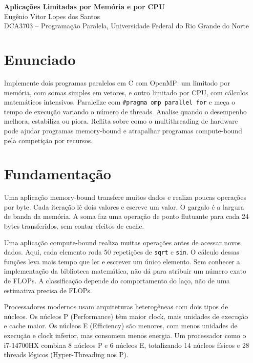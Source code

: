 \documentclass[11pt,letterpaper]{article}
\begin{document}
\pagestyle{plain}
\begin{center}
{\LARGE\bfseries Aplicações Limitadas por Memória e por CPU}\\[0.4em]
{\normalsize Eugênio Vitor Lopes dos Santos}\\[0.3em]
{\small DCA3703 -- Programação Paralela, Universidade Federal do Rio Grande do Norte}\\[0.3em]
\end{center}

\section{Enunciado}
Implemente dois programas paralelos em C com OpenMP: um limitado por memória, com somas simples em vetores, e outro limitado por CPU, com cálculos matemáticos intensivos. Paralelize com \texttt{\#pragma omp parallel for} e meça o tempo de execução variando o número de threads. Analise quando o desempenho melhora, estabiliza ou piora. Reflita sobre como o multithreading de hardware pode ajudar programas memory-bound e atrapalhar programas compute-bound pela competição por recursos.

\section{Fundamentação}
Uma aplicação memory-bound transfere muitos dados e realiza poucas operações por byte. Cada iteração lê dois valores e escreve um valor. O gargalo é a largura de banda da memória. A soma faz uma operação de ponto flutuante para cada 24 bytes transferidos, sem contar efeitos de cache.

Uma aplicação compute-bound realiza muitas operações antes de acessar novos dados. Aqui, cada elemento roda 50 repetições de \texttt{sqrt} e \texttt{sin}. O cálculo dessas funções leva mais tempo que ler e escrever um único elemento. Sem conhecer a implementação da biblioteca matemática, não dá para atribuir um número exato de FLOPs. A classificação depende do comportamento do laço, não de uma estimativa precisa de FLOPs.

Processadores modernos usam arquiteturas heterogêneas com dois tipos de núcleos. Os núcleos P (Performance) têm maior clock, mais unidades de execução e cache maior. Os núcleos E (Efficiency) são menores, com menos unidades de execução e clock inferior, mas consomem menos energia. Um processador como o i7-14700HX combina 8 núcleos P e 6 núcleos E, totalizando 14 núcleos físicos e 28 threads lógicos (Hyper-Threading nos P).
\end{document}
